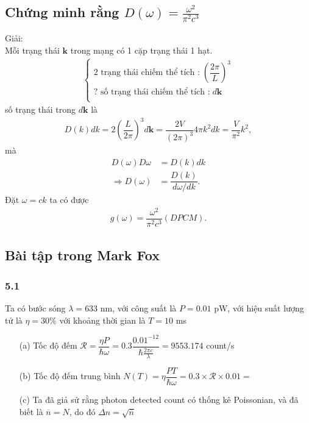 \documentclass{article}
\newcommand{\f}[2]{\dfrac{#1}{#2}}
\begin{document}
\subsection*{Chứng minh rằng $D(\omega) = \frac{\omega^2}{\pi^2 c^3}$}
Giải:\\
Mỗi trạng thái $\mathbf{k}$ trong mạng có 1 cặp trạng thái 1 hạt.
\begin{align*}
	\begin{cases}
		\text{2 trạng thái chiếm thể tích :} \; \left(\f{2\pi}{L}\right)^3 \\
		\text{? số trạng thái chiếm thể tích :} \; d\mathbf{k}             \\
	\end{cases}
\end{align*}
số trạng thái trong $d\mathbf{k}$ là
\begin{align*}
	D(k)dk = 2  \left(\f{L}{2\pi}\right)^3 d\mathbf{k} = \f{2V}{(2\pi)^3} 4\pi k^2 dk = \f{V}{\pi^2}k^2,
\end{align*}
mà
\begin{align*}
	D(\omega) D\omega     & = D(k) dk                 \\
	\Rightarrow D(\omega) & = \f{D(k)}{d\omega / dk}.
\end{align*}
Đặt $\omega = ck$ ta có được
\begin{align*}
	g(\omega) = \f{\omega^2}{\pi^2 c^3} (DPCM).
\end{align*}

\subsection*{Bài tập trong Mark Fox}
\subsubsection*{5.1}
Ta có bước sóng $\lambda = 633$ nm, với công suất là $P = 0.01$ pW, với hiệu suất lượng tử là $\eta = 30\% $ với khoảng thời gian là $T = 10$ ms
\begin{enumerate}
	\item[(a)] Tốc độ đếm $\mathcal{R} = \f{\eta P}{\hbar \omega} = 0.3 \f{0.01^{-12}}{\hbar \frac{2\pi c}{\lambda}} = 9553.174$ count/s
	\item[(b)] Tốc độ đếm trung bình $N(T)= \eta \f{PT}{\hbar \omega} = 0.3 \times \mathcal{R}\times 0.01 =$
	\item[(c)] Ta đã giả sử rằng photon detected count có thống kê Poissonian, và đã biết là $\overline{n} = N$, do đó $\Delta n = \sqrt{\overline{n}}$
\end{enumerate}
\end{document}
